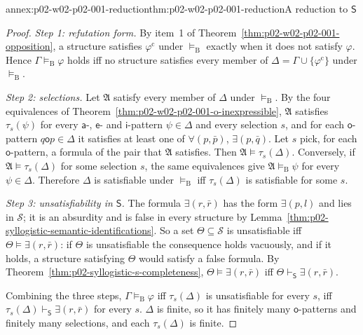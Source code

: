 \begin{annexitem}{annex:p02-w02-p02-001-reduction}{thm:p02-w02-p02-001-reduction}{A reduction to \(\mathsf S\)}
\begin{proof}
\emph{Step 1: refutation form.} By item~1 of
Theorem~\ref{thm:p02-w02-p02-001-opposition}, a structure satisfies
\(\varphi^{\mathrm c}\) under \(\models_{\mathrm B}\) exactly when it does not
satisfy \(\varphi\). Hence \(\Gamma\models_{\mathrm B}\varphi\) holds iff no
structure satisfies every member of \(\Delta=\Gamma\cup\{\varphi^{\mathrm c}\}\)
under \(\models_{\mathrm B}\).

\emph{Step 2: selections.} Let \(\mathfrak A\) satisfy every member of
\(\Delta\) under \(\models_{\mathrm B}\). By the four equivalences of
Theorem~\ref{thm:p02-w02-p02-001-o-inexpressible}, \(\mathfrak A\) satisfies
\(\tau_s(\psi)\) for every \(\mathsf a\)-, \(\mathsf e\)- and
\(\mathsf i\)-pattern \(\psi\in\Delta\) and every selection \(s\), and for
each \(\mathsf o\)-pattern \(q\mathbin{\mathsf o}p\in\Delta\) it satisfies
at least one of \(\forall(p,\bar p)\), \(\exists(p,\bar q)\). Let \(s\) pick,
for each \(\mathsf o\)-pattern, a formula of the pair that \(\mathfrak A\)
satisfies. Then \(\mathfrak A\models\tau_s(\Delta)\). Conversely, if
\(\mathfrak A\models\tau_s(\Delta)\) for some selection \(s\), the same
equivalences give \(\mathfrak A\models_{\mathrm B}\psi\) for every
\(\psi\in\Delta\). Therefore \(\Delta\) is satisfiable under
\(\models_{\mathrm B}\) iff \(\tau_s(\Delta)\) is satisfiable for some \(s\).

\emph{Step 3: unsatisfiability in \(\mathsf S\).} The formula
\(\exists(r,\bar r)\) has the form \(\exists(p,l)\) and lies in
\(\mathcal S\); it is an absurdity and is false in every structure by
Lemma~\ref{thm:p02-syllogistic-semantic-identifications}. So a set
\(\Theta\subseteq\mathcal S\) is unsatisfiable iff
\(\Theta\models\exists(r,\bar r)\): if \(\Theta\) is unsatisfiable the
consequence holds vacuously, and if it holds, a structure satisfying
\(\Theta\) would satisfy a false formula. By
Theorem~\ref{thm:p02-syllogistic-s-completeness},
\(\Theta\models\exists(r,\bar r)\) iff
\(\Theta\vdash_{\mathsf S}\exists(r,\bar r)\).

Combining the three steps, \(\Gamma\models_{\mathrm B}\varphi\) iff
\(\tau_s(\Delta)\) is unsatisfiable for every \(s\), iff
\(\tau_s(\Delta)\vdash_{\mathsf S}\exists(r,\bar r)\) for every \(s\).
\(\Delta\) is finite, so it has finitely many \(\mathsf o\)-patterns and
finitely many selections, and each \(\tau_s(\Delta)\) is finite.
\end{proof}
\end{annexitem}

